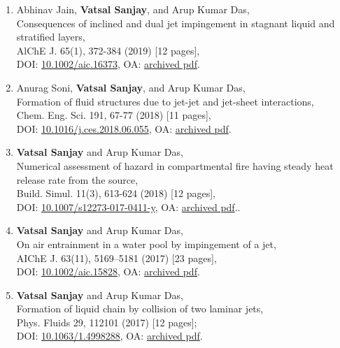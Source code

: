 \documentclass[11pt,a4paper,roman,english,colorlinks,linkcolor={red!50!black}]{moderncv}
\begin{document}
\begin{enumerate}[leftmargin=0.75cm]
	\item Abhinav Jain, \textbf{Vatsal Sanjay}, and Arup Kumar Das,\\
	Consequences of inclined and dual jet impingement in stagnant liquid and stratified layers,\\
	AlChE J. 65(1), 372-384  (2019) [12 pages],\\
	DOI: \href{https://doi.org/10.1002/aic.16373}{10.1002/aic.16373}, OA: \href{https://tinyurl.com/24p5dy8s}{archived pdf}.

	\item Anurag Soni, \textbf{Vatsal Sanjay}, and Arup Kumar Das,\\
	Formation of fluid structures due to jet-jet and jet-sheet interactions,\\
	Chem. Eng. Sci. 191, 67-77  (2018) [11 pages],\\
	DOI: \href{https://doi.org/10.1016/j.ces.2018.06.055}{10.1016/j.ces.2018.06.055}, OA: \href{https://tinyurl.com/2bv5fznd}{archived pdf}.

	\item \textbf{Vatsal Sanjay} and Arup Kumar Das,\\
	Numerical assessment of hazard in compartmental fire having steady heat release rate from the source,\\
	Build. Simul. 11(3), 613-624  (2018) [12 pages],\\
	DOI: \href{https://doi.org/10.1007/s12273-017-0411-y}{10.1007/s12273-017-0411-y}, OA: \href{https://tinyurl.com/2bwhzlzv}{archived pdf}..

	\item \textbf{Vatsal Sanjay} and Arup Kumar Das,\\
	On air entrainment in a water pool by impingement of a jet,\\
	AIChE J. 63(11), 5169--5181  (2017) [23 pages],\\
	DOI: \href{https://doi.org/10.1002/aic.15828}{10.1002/aic.15828}, OA: \href{https://tinyurl.com/24ne4oql}{archived pdf}.

	\item \textbf{Vatsal Sanjay} and Arup Kumar Das,\\
	Formation of liquid chain by collision of two laminar jets,\\
	Phys. Fluids 29, 112101  (2017) [12 pages];\\
	DOI: \href{https://doi.org/10.1063/1.4998288}{10.1063/1.4998288}, OA: \href{https://tinyurl.com/27sd7lgo}{archived pdf}.

\end{enumerate}
\end{document}
